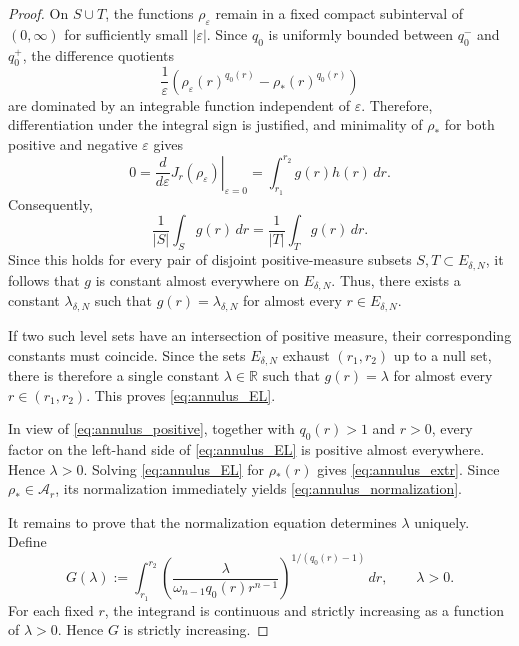 \documentclass[10pt,a4paper]{amsart}
\begin{document}
\begin{proof}
On $S\cup T$, the functions $\rho_\varepsilon$ remain in a fixed
compact subinterval of $(0,\infty)$ for sufficiently small
$|\varepsilon|$. Since $q_0$ is uniformly bounded between $q_0^-$ and
$q_0^+$, the difference quotients
\begin{equation*}
\frac{
1
}{\varepsilon}\left(\rho_\varepsilon(r)^{q_0(r)}
-
\rho_*(r)^{q_0(r)}\right)
\end{equation*}
are dominated by an integrable function independent of $\varepsilon$.
Therefore, differentiation under the integral sign is justified, and
minimality of $\rho_*$ for both positive and negative $\varepsilon$
gives
\begin{equation}
\label{eq:annulus_first_variation}
0
=
\left.
\frac{d}{d\varepsilon}
J_r(\rho_\varepsilon)
\right|_{\varepsilon=0}
=
\int_{r_1}^{r_2}
g(r)h(r)\,dr.
\end{equation}
Consequently,
\begin{equation*}
\frac{1}{|S|}\int_S g(r)\,dr
=
\frac{1}{|T|}\int_T g(r)\,dr.
\end{equation*}
Since this holds for every pair of disjoint positive-measure subsets
$S,T\subset E_{\delta,N}$, it follows that $g$ is constant almost
everywhere on $E_{\delta,N}$. Thus, there exists a constant
$\lambda_{\delta,N}$ such that $g(r)=\lambda_{\delta,N}$
for almost every $r\in E_{\delta,N}$.

If two such level sets have an intersection of positive measure, their
corresponding constants must coincide. Since the sets
$E_{\delta,N}$ exhaust $(r_1,r_2)$ up to a null set, there is therefore
a single constant $\lambda\in\mathbb R$ such that $g(r)=\lambda$ for almost every $r\in(r_1,r_2)$.
This proves \eqref{eq:annulus_EL}.

In view of
\eqref{eq:annulus_positive}, together with
$q_0(r)>1$ and $r>0$, every factor on the left-hand side of
\eqref{eq:annulus_EL} is positive almost everywhere. Hence
$\lambda>0$.
Solving \eqref{eq:annulus_EL} for $\rho_*(r)$ gives
\eqref{eq:annulus_extr}. Since $\rho_*\in\mathcal A_r$, its normalization
immediately yields \eqref{eq:annulus_normalization}.

It remains to prove that the normalization equation determines $\lambda$
uniquely. Define
\begin{equation}
\label{eq:annulus_G}
G(\lambda)
:=
\int_{r_1}^{r_2}
\left(
\frac{\lambda}
{\omega_{n-1}q_0(r)r^{n-1}}
\right)^{\!1/(q_0(r)-1)}
\,dr,
\qquad \lambda>0.
\end{equation}
For each fixed $r$, the integrand is continuous and strictly increasing
as a function of $\lambda>0$. Hence $G$ is strictly increasing.


\end{proof}
\end{document}
